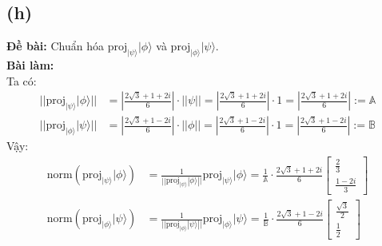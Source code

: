 \subsection{(h)}
\textbf{Đề bài:} Chuẩn hóa $\mathrm{proj}_{|\psi\rangle}|\phi\rangle$ và $\mathrm{proj}_{|\phi\rangle}|\psi\rangle$.\\
\textbf{Bài làm:}\\
Ta có:
\begin{align*}
    ||\mathrm{proj}_{|\psi\rangle}|\phi\rangle|| &= \left|\frac{2\sqrt{3} + 1 + 2i}{6}\right| \cdot ||\psi|| = \left|\frac{2\sqrt{3} + 1 + 2i}{6}\right| \cdot 1 = \left|\frac{2\sqrt{3} + 1 + 2i}{6}\right| := \mathbb{A}\\
    ||\mathrm{proj}_{|\phi\rangle}|\psi\rangle|| &= \left|\frac{2\sqrt{3} + 1 - 2i}{6}\right| \cdot ||\phi|| = \left|\frac{2\sqrt{3} + 1 - 2i}{6}\right| \cdot 1 = \left|\frac{2\sqrt{3} + 1 - 2i}{6}\right| := \mathbb{B}
\end{align*}
Vậy:
\begin{align*}
    \mathrm{norm}(\mathrm{proj}_{|\psi\rangle}|\phi\rangle) &= \frac{1}{||\mathrm{proj}_{|\psi\rangle}|\phi\rangle||} \mathrm{proj}_{|\psi\rangle}|\phi\rangle = \frac{1}{\mathbb{A}} \cdot \frac{2\sqrt{3} + 1 + 2i}{6} \begin{bmatrix}
        \frac{2}{3} \\
        \frac{1-2i}{3}
    \end{bmatrix}\\
    \mathrm{norm}(\mathrm{proj}_{|\phi\rangle}|\psi\rangle) &= \frac{1}{||\mathrm{proj}_{|\phi\rangle}|\psi\rangle||} \mathrm{proj}_{|\phi\rangle}|\psi\rangle = \frac{1}{\mathbb{B}} \cdot \frac{2\sqrt{3} + 1 - 2i}{6} \begin{bmatrix}
        \frac{\sqrt{3}}{2} \\
        \frac{1}{2}
    \end{bmatrix}
\end{align*}

